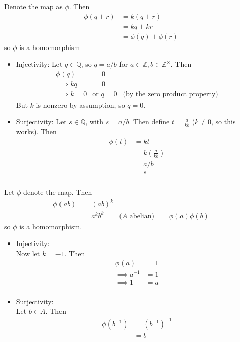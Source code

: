 \documentclass{article}
\newcommand{\ints}{\mathbb{Z}}
\newcommand{\rats}{\mathbb{Q}}
\newcommand{\inv}[1]{ {#1}^{-1} }
\begin{document}
\subsubsection{}\label{6p21}
Denote the map as $\phi$. Then
\begin{align*}
\phi(q + r) &= k(q+r)\\
&= kq + kr\\
&= \phi(q) + \phi(r)
\end{align*}
so $\phi$ is a homomorphism\\
\begin{itemize}
\item Injectivity:
Let $q \in \rats$, so $q = a/b$ for $a\in \ints, b\in\ints^{\times}$. Then\\
\begin{align*}
\phi(q) &= 0\\
\implies kq &= 0\\
\implies k = 0 &\mbox{or } q = 0 &\mbox{(by the zero product property)}
\end{align*}
But $k$ is nonzero by assumption, so $q=0$. 
\item Surjectivity:
Let $s\in\rats$, with $s=a/b$. Then define $t=\frac{a}{kb}$ ($k\neq 0$, so this works). Then
\begin{align*}
\phi(t) &= kt\\
&= k(\frac{a}{kb})\\
&= a/b\\
&= s
\end{align*}
\end{itemize}
\subsubsection{}\label{ex6p22}
Let $\phi$ denote the map. Then 
\begin{align*}
\phi(ab) &= (ab)^k\\
&= a^kb^k & \mbox{($A$ abelian)}
&= \phi(a)\phi(b)
\end{align*}
so $\phi$ is a homomorphism.

\begin{itemize}
\item Injectivity:\\
Now let $k = -1$. Then 
\begin{align*}
\phi(a) &= 1\\
\implies \inv{a} &= 1\\
\implies 1 &= a\\
\end{align*}

\item Surjectivity:\\
Let $b \in A$. Then
\begin{align*}
\phi(\inv{b}) &= \inv{(\inv{b})}\\
&= b
\end{align*}
\end{itemize}
\end{document}
